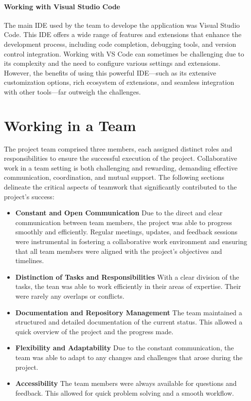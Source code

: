 \paragraph{Working with Visual Studio Code}

The main IDE used by the team to develope the application was Visual Studio Code. This IDE offers a wide range of features and extensions that enhance the development process, including code completion, debugging tools, and version control integration.
Working with VS Code can sometimes be challenging due to its complexity and the need to configure various settings and extensions. However, the benefits of using this powerful IDE—such as its extensive customization options, rich ecosystem of extensions, and seamless integration with other tools—far outweigh the challenges.

\section{Working in a Team}

The project team comprised three members, each assigned distinct roles and responsibilities to ensure the successful execution of the project. Collaborative work in a team setting is both challenging and rewarding, demanding effective communication, coordination, and mutual support. The following sections delineate the critical aspects of teamwork that significantly contributed to the project’s success:

\begin{itemize}
    \item \textbf{Constant and Open Communication} Due to the direct and clear communication between team members, the project was able to progress smoothly and efficiently. Regular meetings, updates, and feedback sessions were instrumental in fostering a collaborative work environment and ensuring that all team members were aligned with the project’s objectives and timelines.
    \item \textbf{Distinction of Tasks and Responsibilities} With a clear division of the tasks, the tean was able to work efficiently in their areas of expertise. Their were rarely any overlaps or conflicts.
    \item \textbf{Documentation and Repository Management} The team maintained a structured and detailed documentation of the current status. This allowed a quick overview of the project and the progress made.
    \item \textbf{Flexibility and Adaptability} Due to the constant communication, the team was able to adapt to any changes and challenges that arose during the project.
    \item \textbf{Accessibility} The team members were always available for questions and feedback. This allowed for quick problem solving and a smooth workflow.
\end{itemize}

